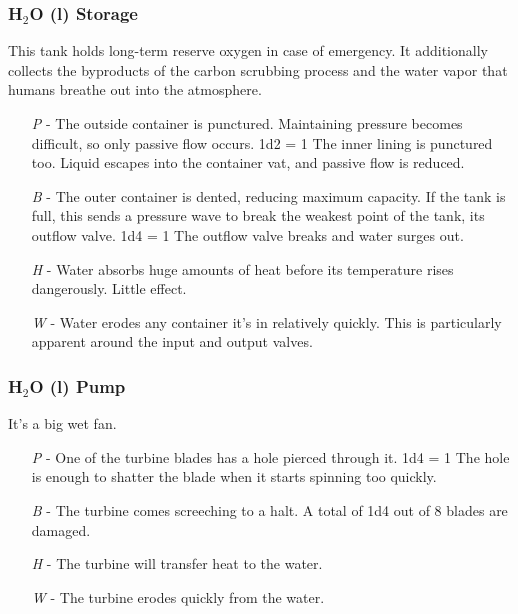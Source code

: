 \documentclass[a4paper]{article}
\begin{document}
\vspace{-0.5cm} \hspace{-18pt} \subsubsection{H$_2$O (l) Storage} \label{life_h2o_storage} \vspace{-0.2cm}
This tank holds long-term reserve oxygen in case of emergency. It additionally collects the byproducts of the carbon scrubbing process and the water vapor that humans breathe out into the atmosphere.
\begin{enumerate}
\item [\textit{P}] - The outside container is punctured. Maintaining pressure becomes difficult, so only passive flow occurs. \newline \vspace{-3pt} 1d2 = 1 The inner lining is punctured too. Liquid escapes into the container vat, and passive flow is reduced.
\item [\textit{B}] - The outer container is dented, reducing maximum capacity. If the tank is full, this sends a pressure wave to break the weakest point of the tank, its outflow valve. 1d4 = 1 The outflow valve breaks and water surges out.
\item [\textit{H}] - Water absorbs huge amounts of heat before its temperature rises dangerously. Little effect.
\item [\textit{W}] - Water erodes any container it's in relatively quickly. This is particularly apparent around the input and output valves.
\end{enumerate}

\vspace{-0.5cm} \hspace{-18pt} \subsubsection{H$_2$O (l) Pump} \label{life_h2o_pump} \vspace{-0.2cm}
It's a big wet fan.
\begin{enumerate}
\item [\textit{P}] - One of the turbine blades has a hole pierced through it. \newline \hspace*{3pt} 1d4 = 1 The hole is enough to shatter the blade when it starts spinning too quickly. 
\item [\textit{B}] - The turbine comes screeching to a halt. A total of 1d4 out of 8 blades are damaged.
\item [\textit{H}] - The turbine will transfer heat to the water. 
\item [\textit{W}] - The turbine erodes quickly from the water.
\end{enumerate}
\end{document}
